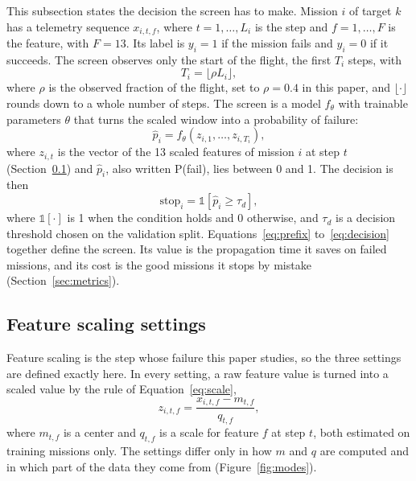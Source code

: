 This subsection states the decision the screen has to make. Mission $i$ of target $k$ has a telemetry sequence $x_{i,t,f}$, where $t = 1, \ldots, L_i$ is the step and $f = 1, \ldots, F$ is the feature, with $F = 13$. Its label is $y_i = 1$ if the mission fails and $y_i = 0$ if it succeeds. The screen observes only the start of the flight, the first $T_i$ steps, with
\begin{equation}
T_i = \lfloor \rho L_i \rfloor,
\label{eq:prefix}
\end{equation}
where $\rho$ is the observed fraction of the flight, set to $\rho = 0.4$ in this paper, and $\lfloor \cdot \rfloor$ rounds down to a whole number of steps. The screen is a model $f_\theta$ with trainable parameters $\theta$ that turns the scaled window into a probability of failure:
\begin{equation}
\hat{p}_i = f_\theta \left( z_{i,1}, \ldots, z_{i,T_i} \right),
\label{eq:screen}
\end{equation}
where $z_{i,t}$ is the vector of the 13 scaled features of mission $i$ at step $t$ (Section~\ref{sec:scaling}) and $\hat{p}_i$, also written P(fail), lies between 0 and 1. The decision is then
\begin{equation}
\mathrm{stop}_i = \mathbb{1} \left[ \hat{p}_i \ge \tau_d \right],
\label{eq:decision}
\end{equation}
where $\mathbb{1}[\cdot]$ is 1 when the condition holds and 0 otherwise, and $\tau_d$ is a decision threshold chosen on the validation split. Equations~\ref{eq:prefix} to~\ref{eq:decision} together define the screen. Its value is the propagation time it saves on failed missions, and its cost is the good missions it stops by mistake (Section~\ref{sec:metrics}).

\subsection{Feature scaling settings}
\label{sec:scaling}

Feature scaling is the step whose failure this paper studies, so the three settings are defined exactly here. In every setting, a raw feature value is turned into a scaled value by the rule of Equation~\ref{eq:scale},
\begin{equation}
z_{i,t,f} = \frac{x_{i,t,f} - m_{t,f}}{q_{t,f}},
\label{eq:scale}
\end{equation}
where $m_{t,f}$ is a center and $q_{t,f}$ is a scale for feature $f$ at step $t$, both estimated on training missions only. The settings differ only in how $m$ and $q$ are computed and in which part of the data they come from (Figure~\ref{fig:modes}).

